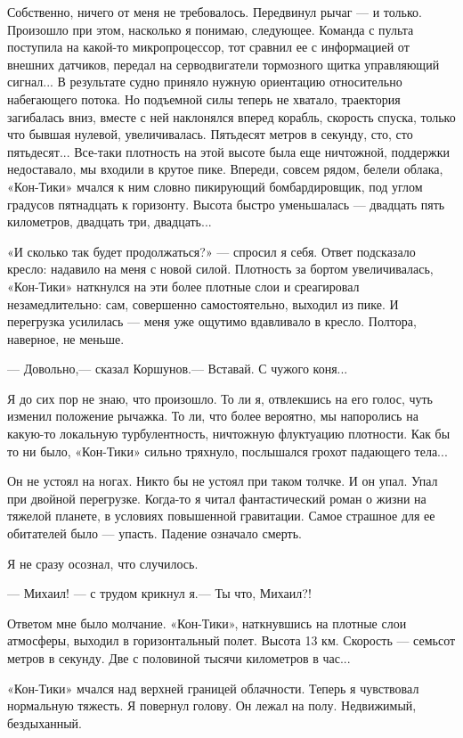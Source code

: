 \documentclass[11pt,a4paper,oneside]{article}
\begin{document}
Собственно, ничего от меня не требовалось. Передвинул рычаг — и только. Произошло при этом, насколько я понимаю, следующее. Команда с пульта поступила на какой-то микропроцессор, тот сравнил ее с информацией от внешних датчиков, передал на серводвигатели тормозного щитка управляющий сигнал... В результате судно приняло нужную ориентацию относительно набегающего потока. Но подъемной силы теперь не хватало, траектория загибалась вниз, вместе с ней наклонялся вперед корабль, скорость спуска, только что бывшая нулевой, увеличивалась. Пятьдесят метров в секунду, сто, сто пятьдесят... Все-таки плотность на этой высоте была еще ничтожной, поддержки недоставало, мы входили в крутое пике. Впереди, совсем рядом, белели облака, «Кон-Тики» мчался к ним словно пикирующий бомбардировщик, под углом градусов пятнадцать к горизонту. Высота быстро уменьшалась — двадцать пять километров, двадцать три, двадцать...

«И сколько так будет продолжаться?» — спросил я себя. Ответ подсказало кресло: надавило на меня с новой силой. Плотность за бортом увеличивалась, «Кон-Тики» наткнулся на эти более плотные слои и среагировал незамедлительно: сам, совершенно самостоятельно, выходил из пике. И перегрузка усилилась — меня уже ощутимо вдавливало в кресло. Полтора, наверное, не меньше.

— Довольно,— сказал Коршунов.— Вставай. С чужого коня...

Я до сих пор не знаю, что произошло. То ли я, отвлекшись на его голос, чуть изменил положение рычажка. То ли, что более вероятно, мы напоролись на какую-то локальную турбулентность, ничтожную флуктуацию плотности. Как бы то ни было, «Кон-Тики» сильно тряхнуло, послышался грохот падающего тела...

Он не устоял на ногах. Никто бы не устоял при таком толчке. И он упал. Упал при двойной перегрузке. Когда-то я читал фантастический роман о жизни на тяжелой планете, в условиях повышенной гравитации. Самое страшное для ее обитателей было — упасть. Падение означало смерть.

Я не сразу осознал, что случилось.

— Михаил! — с трудом крикнул я.— Ты что, Михаил?!

Ответом мне было молчание. «Кон-Тики», наткнувшись на плотные слои атмосферы, выходил в горизонтальный полет. Высота 13 км. Скорость — семьсот метров в секунду. Две с половиной тысячи километров в час...

«Кон-Тики» мчался над верхней границей облачности. Теперь я чувствовал нормальную тяжесть. Я повернул голову. Он лежал на полу. Недвижимый, бездыханный.
\end{document}
